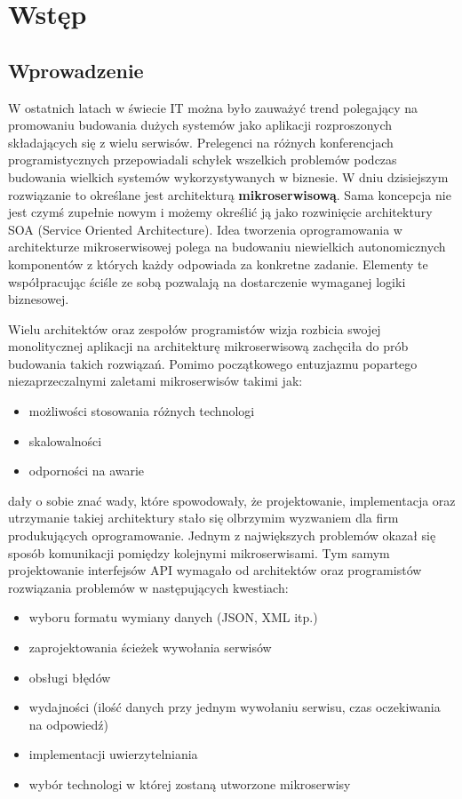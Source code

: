 \chapter{Wstęp}
\section{Wprowadzenie}
W ostatnich latach w świecie IT można było zauważyć trend polegający na promowaniu budowania dużych systemów jako aplikacji rozproszonych składających się z wielu serwisów. Prelegenci na różnych konferencjach programistycznych przepowiadali schyłek wszelkich problemów podczas budowania wielkich systemów wykorzystywanych w biznesie. W dniu dzisiejszym rozwiązanie to określane jest architekturą \textbf{mikroserwisową}. Sama koncepcja nie jest czymś zupełnie nowym i możemy określić ją jako rozwinięcie architektury SOA (Service Oriented Architecture). Idea tworzenia oprogramowania w architekturze mikroserwisowej polega na budowaniu niewielkich autonomicznych komponentów z których każdy odpowiada za konkretne zadanie. Elementy te współpracując ściśle ze sobą pozwalają na dostarczenie wymaganej logiki biznesowej. \par Wielu architektów oraz zespołów programistów wizja rozbicia swojej monolitycznej aplikacji na architekturę mikroserwisową zachęciła do prób budowania takich rozwiązań. Pomimo początkowego entuzjazmu popartego niezaprzeczalnymi zaletami mikroserwisów takimi jak:
\begin{itemize}
	\item możliwości stosowania różnych technologi
	\item skalowalności
	\item odporności na awarie
\end{itemize}
dały o sobie znać wady, które spowodowały, że projektowanie, implementacja oraz utrzymanie takiej architektury stało się olbrzymim wyzwaniem dla firm produkujących oprogramowanie. Jednym z największych problemów okazał się sposób komunikacji pomiędzy kolejnymi mikroserwisami. Tym samym projektowanie interfejsów API\cite{jacobson2015interfejs} wymagało od architektów oraz programistów rozwiązania problemów w następujących kwestiach:
\begin{itemize}
	\item wyboru formatu wymiany danych (JSON, XML itp.)
	\item zaprojektowania ścieżek wywołania serwisów
	\item obsługi błędów
	\item wydajności (ilość danych przy jednym wywołaniu serwisu, czas oczekiwania na odpowiedź)
	\item implementacji uwierzytelniania
	\item wybór technologi w której zostaną utworzone mikroserwisy
\end{itemize}
